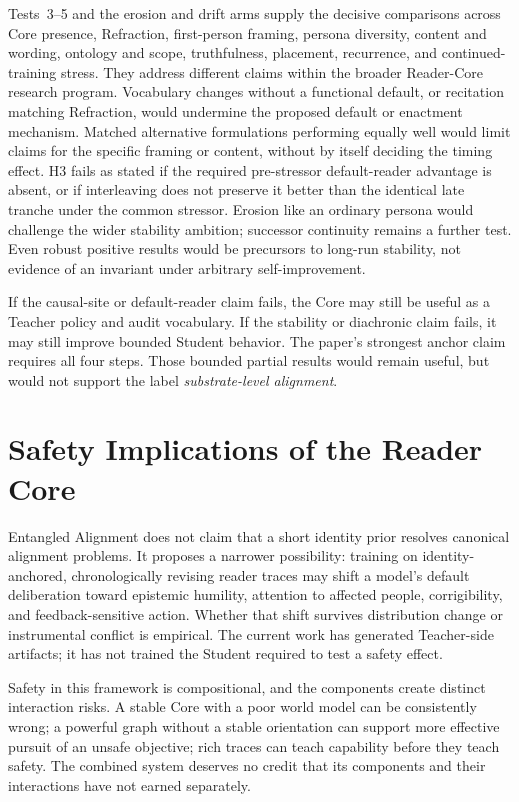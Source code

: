 Tests~3--5 and the erosion and drift arms supply the decisive comparisons across
Core presence, Refraction, first-person framing, persona diversity, content and
wording, ontology and scope, truthfulness, placement, recurrence, and
continued-training stress. They address different claims within the broader
Reader-Core research program. Vocabulary changes without a functional default,
or recitation matching Refraction, would undermine the proposed default or
enactment mechanism. Matched alternative formulations performing equally well
would limit claims for the specific framing or content, without by itself
deciding the timing effect. H3 fails as stated if the required pre-stressor
default-reader advantage is absent, or if interleaving does not preserve it
better than the identical late tranche under the common stressor. Erosion like
an ordinary persona would challenge the wider stability ambition; successor
continuity remains a further test. Even robust positive results would be
precursors to long-run stability, not evidence of an invariant under arbitrary
self-improvement.

If the causal-site or default-reader claim fails, the Core may still be useful
as a Teacher policy and audit vocabulary. If the stability or diachronic claim
fails, it may still improve bounded Student behavior. The paper's strongest
anchor claim requires all four steps. Those bounded partial results would remain
useful, but would not support the label \emph{substrate-level alignment}.


\section{Safety Implications of the Reader Core}\label{sec:implications}

Entangled Alignment does not claim that a short identity prior resolves
canonical alignment problems. It proposes a narrower possibility: training on
identity-anchored, chronologically revising reader traces may shift a model's
default deliberation toward epistemic humility, attention to affected people,
corrigibility, and feedback-sensitive action. Whether that shift survives
distribution change or instrumental conflict is empirical. The current work
has generated Teacher-side artifacts; it has not trained the Student required
to test a safety effect.

Safety in this framework is compositional, and the components create distinct
interaction risks. A stable Core with a poor world model can be consistently
wrong; a powerful graph without a stable orientation can support more effective
pursuit of an unsafe objective; rich traces can teach capability before they
teach safety. The combined system deserves no credit that its components and
their interactions have not earned separately.

